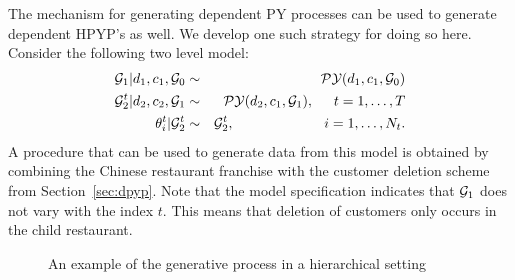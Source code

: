 The mechanism for generating dependent PY processes can be used to generate dependent HPYP's as well.  We develop one such strategy for doing so here.  Consider the following two level model: 
%
\begin{eqnarray}
\G_1 | d_1, c_1, \G_0 &\sim& \PY(d_1, c_1, \G_0)  \label{fig:dhpyp} \\
\G_2^t | d_2, c_2, \G_1&\sim& \PY(d_2, c_1, \G_1), \hspace{.5cm} t = 1,\dots, T \nonumber\\
 \theta^t_i | \G_2^t &\sim& \G_2^t ,\hspace{2.27cm} i = 1,\dots, N_t. \nonumber
\end{eqnarray}
%
A procedure that can be used to generate data from this model is obtained by combining the Chinese restaurant franchise with the customer deletion scheme from Section~\ref{sec:dpyp}.  Note that the model specification indicates that $\G_1$ does not vary with the index $t$.  This means that deletion of customers only occurs in the child restaurant.

\begin{figure}[t] 
	\begin{center}
		\caption{An example of the generative process in a hierarchical setting}
		\label{figVHPY}
	\end{center} 
\end{figure} 

